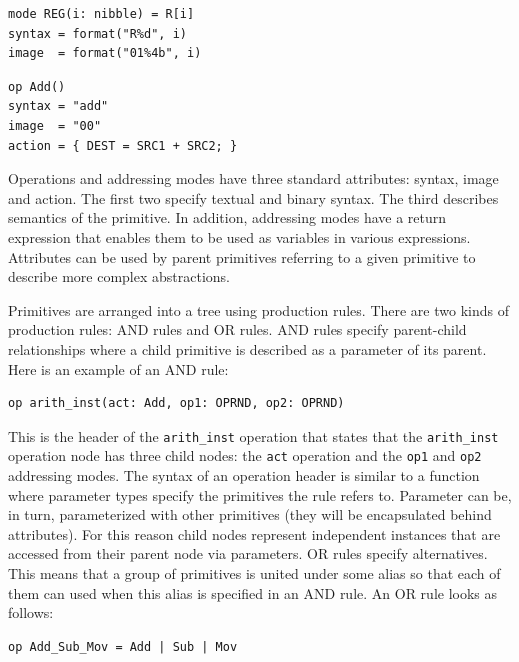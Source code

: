 \documentclass[oneside,final,14pt]{extreport}
\begin{document}
\begin{lstlisting}
mode REG(i: nibble) = R[i]
syntax = format("R%d", i)
image  = format("01%4b", i)
\end{lstlisting}

\begin{lstlisting}
op Add()
syntax = "add" 
image  = "00" 
action = { DEST = SRC1 + SRC2; }
\end{lstlisting}

Operations and addressing modes have three standard attributes: syntax, image
and action. The first two specify textual and binary syntax. The third
describes semantics of the primitive. In addition, addressing modes have
a return expression that enables them to be used as variables in various
expressions. Attributes can be used by parent primitives referring to a given
primitive to describe more complex abstractions.

Primitives are arranged into a tree using production rules. There are two kinds
of production rules: AND rules and OR rules. AND rules specify parent-child
relationships where a child primitive is described as a parameter of its
parent. Here is an example of an AND rule:

\begin{lstlisting}
op arith_inst(act: Add, op1: OPRND, op2: OPRND)
\end{lstlisting}

This is the header of the {\tt arith{\_}inst} operation that states that the
{\tt arith{\_}inst} operation node has three child nodes: the {\tt act} operation and the
{\tt op1} and {\tt op2} addressing modes. The syntax of an operation header is similar
to a function where parameter types specify the primitives the rule refers to.
Parameter can be, in turn, parameterized with other primitives (they will be
encapsulated behind attributes). For this reason child nodes represent
independent instances that are accessed from their parent node via parameters.
OR rules specify alternatives. This means that a group of primitives is united
under some alias so that each of them can used when this alias is specified in
an AND rule. An OR rule looks as follows:

\begin{lstlisting}
op Add_Sub_Mov = Add | Sub | Mov
\end{lstlisting}
\end{document}
